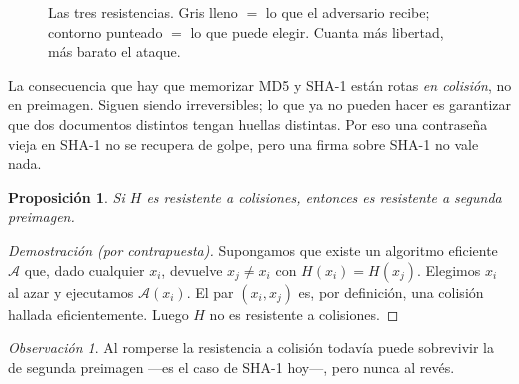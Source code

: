 \documentclass[11pt,a4paper]{article}
\theoremstyle{definition}
\theoremstyle{plain}
\newtheorem{proposicion}{Proposición}
\theoremstyle{remark}
\newtheorem*{observacion}{Observación}
\begin{document}
\begin{figure}[htbp]
\caption{Las tres resistencias. Gris lleno $=$ lo que el adversario recibe;
contorno punteado $=$ lo que puede elegir. Cuanta más libertad, más barato el
ataque.}
\label{fig:resistencias}
\end{figure}

\begin{nota}{La consecuencia que hay que memorizar}
MD5 y SHA-1 están rotas \emph{en colisión}, no en preimagen. Siguen siendo
irreversibles; lo que ya no pueden hacer es garantizar que dos documentos
distintos tengan huellas distintas. Por eso una contraseña vieja en SHA-1 no se
recupera de golpe, pero una firma sobre SHA-1 no vale nada.
\end{nota}

\begin{proposicion}\label{prop:col-implica-2pre}
Si $H$ es resistente a colisiones, entonces es resistente a segunda preimagen.
\end{proposicion}

\begin{proof}[Demostración (por contrapuesta)]
Supongamos que existe un algoritmo eficiente $\mathcal{A}$ que, dado cualquier
$x_i$, devuelve $x_j \neq x_i$ con $H(x_i) = H(x_j)$. Elegimos $x_i$ al azar y
ejecutamos $\mathcal{A}(x_i)$. El par $(x_i, x_j)$ es, por definición, una
colisión hallada eficientemente. Luego $H$ no es resistente a colisiones.
\end{proof}

\begin{observacion}
Al romperse la resistencia a colisión todavía puede sobrevivir la de segunda
preimagen ---es el caso de SHA-1 hoy---, pero nunca al revés.
\end{observacion}
\end{document}
